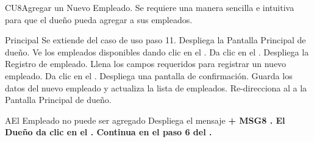\begin{UseCase}{CU8}{Agregar un Nuevo Empleado.}{
		Se requiere una manera sencilla e intuitiva para que el dueño pueda agregar a sus empleados.
	}
	\end{UseCase}
	\begin{UCtrayectoria}{Principal}
		\UCpaso Se extiende del caso de uso  paso 11.
		\UCpaso Despliega la  {Pantalla Principal de dueño}.
		\UCpaso[\UCactor] Ve los empleados disponibles dando clic en el .
		\UCpaso[\UCactor] Da clic en el  .
		\UCpaso Despliega la  {Registro de empleado}.
		\UCpaso [\UCactor] Llena los campos requeridos para registrar un nuevo empleado. 
		\UCpaso[\UCactor] Da clic en el  .
		\UCpaso Despliega una pantalla de confirmación. 
		\UCpaso Guarda los datos del nuevo empleado y actualiza la lista de empleados.
		\UCpaso Re-direcciona al \UCactor a la  {Pantalla Principal de dueño}.
	\end{UCtrayectoria}


		\begin{UCtrayectoriaA}{A}{El Empleado no puede ser agregado}
			\UCpaso Despliega el mensaje \bf {+ MSG8 }  .
			\UCpaso[\UCactor] El Dueño da clic en el .
			\UCpaso Continua en el paso 6 del .
		\end{UCtrayectoriaA}

